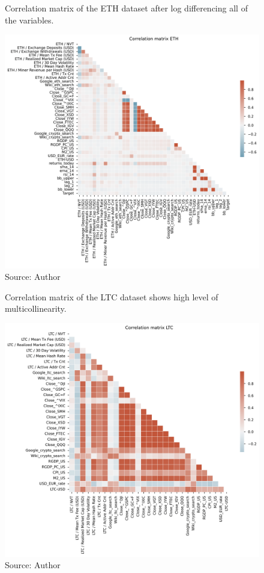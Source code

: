 \begin{figure}[!h]
    \centering
    \caption{Correlation matrix of the ETH dataset after
    log differencing all of the variables.}
    \includegraphics[width=1\textwidth]{Figures/Corr_eth_logdiff.png}
    \caption*{Source: Author}
    \label{fig:Corr_eth_logdiff}
\end{figure}

\begin{figure}[!h]
    \centering
    \caption{Correlation matrix of the LTC dataset shows high level of 
    multicollinearity.}
    \includegraphics[width=1\textwidth]{Figures/Corr_ltc.png}
    \caption*{Source: Author}
    \label{fig:Corr_ltc}
\end{figure}

